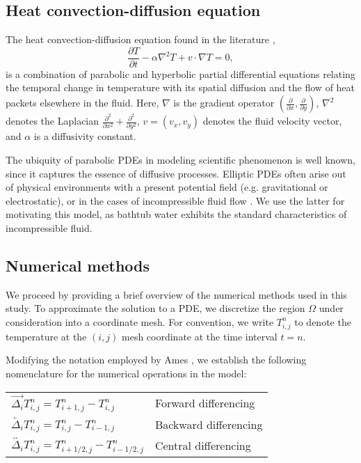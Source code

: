 \documentclass[12pt]{article}
\newcommand{\la}{\overleftarrow}
\newcommand{\ra}{\overrightarrow}
\newcommand{\ca}{\overleftrightarrow}
\begin{document}
\subsection{Heat convection-diffusion equation}

The heat convection-diffusion equation found in the literature
\cite{convection-diffusion},
\begin{equation}
    \frac{\partial T}{\partial t} - \alpha \nabla^2 T + v \cdot \nabla T =
    0,
    \label{eq:\theequation}
\end{equation}
is a combination of parabolic and hyperbolic partial differential equations
relating the temporal change in temperature with its spatial diffusion and
the flow of heat packets elsewhere in the fluid.     Here, $\nabla$ is the
gradient operator $\left( \frac{\partial}{\partial x},
\frac{\partial}{\partial y} \right)$, $\nabla^2$ denotes the Laplacian
$\frac{\partial^2}{\partial x^2} + \frac{\partial^2}{\partial y^2}$, $v =
(v_x, v_y)$ denotes the fluid velocity vector, and $\alpha$ is a diffusivity
constant.

The ubiquity of parabolic PDEs in modeling scientific phenomenon is well
known, since it captures the essence of diffusive processes. Elliptic PDEs
often arise out of physical environments with a present potential field
(e.g.  gravitational or electrostatic), or in the cases of incompressible
fluid flow \cite{convection-diffusion, ames}. We use the latter for
motivating this model, as bathtub water exhibits the standard
characteristics of incompressible fluid.

\subsection{Numerical methods}

We proceed by providing a brief overview of the numerical methods used in
this study. To approximate the solution to a PDE, we discretize the region
$\Omega$ under consideration into a coordinate mesh. For convention, we
write $T_{i,j}^{n}$ to denote the temperature at the $(i,j)$ mesh coordinate
at the time interval $t=n$. 

Modifying the notation employed by Ames \cite{ames}, we establish the
following nomenclature for the numerical operations in the model:

\begin{center}
    \begin{tabular}[]{ll}
        $\ra{\Delta_i} T_{i,j}^n = T_{i+1,j}^n - T_{i,j}^n$ & Forward
        differencing \\
        $\la{\Delta_i} T_{i,j}^n = T_{i,j}^n - T_{i-1,j}^n$ & Backward differencing \\
        $\ca{\Delta_i} T_{i,j}^n = T_{i+1/2,j}^n - T_{i-1/2,j}^n$ & Central differencing
    \end{tabular}
\end{center}
\end{document}
